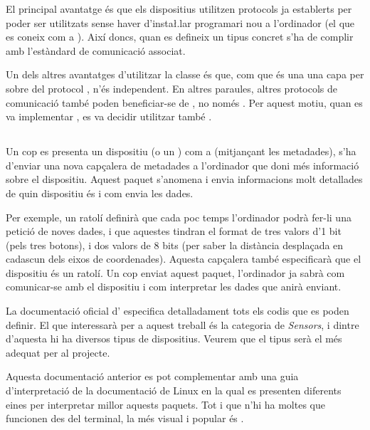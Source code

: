 El principal avantatge és que els dispositius
 utilitzen protocols ja establerts per poder ser utilitzats
sense haver d'insta\l.lar programari nou a l'ordinador (el que es coneix com
a ). Així doncs, quan es defineix un tipus  concret
s'ha de complir amb l'estàndard de comunicació associat.

Un dels altres avantatges d'utilitzar la classe  és que, com que és
una una capa per sobre del protocol , n'és independent. En altres paraules,
altres protocols de comunicació també poden beneficiar-se de , no
només . Per aquest motiu, quan es va implementar ,
es va decidir utilitzar també  \cite{BluetoothHid}.

\subsection{}

Un cop es presenta un dispositiu (o un ) com a 
(mitjançant les metadades), s'ha d'enviar una nova capçalera de metadades a
l'ordinador que doni més informació sobre el dispositiu. Aquest paquet s'anomena
 i envia informacions molt detallades de
quin dispositiu és i com envia les dades.

Per exemple, un ratolí definirà que cada poc temps l'ordinador podrà fer-li
una petició de noves dades, i que aquestes tindran el format de tres valors
d'1 bit (pels tres botons), i dos valors de 8 bits (per saber la distància
desplaçada en cadascun dels eixos de coordenades). Aquesta capçalera també
especificarà que el dispositiu és un ratolí. Un cop enviat aquest paquet,
l'ordinador ja sabrà com comunicar-se amb el
dispositiu i com interpretar les dades que anirà enviant.

La documentació oficial d' \cite{HidHut} especifica
detalladament tots els codis que es poden definir. El que interessarà per a
aquest treball és la categoria de \emph{Sensors}, i dintre d'aquesta hi ha
diversos tipus de dispositius. Veurem que el tipus  serà
el més adequat per al projecte.

Aquesta documentació anterior es pot complementar amb una guia d'interpretació
de la documentació de Linux \cite{LinuxHid} en la qual es presenten diferents eines
per interpretar millor aquests paquets. Tot i que n'hi ha moltes que
funcionen des del terminal, la més visual i popular és .

